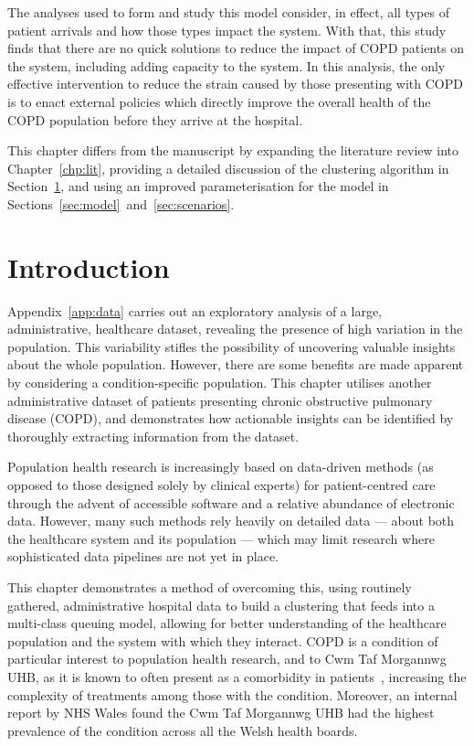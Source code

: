 The analyses used to form and study this model consider, in effect, all types of
patient arrivals and how those types impact the system. With that, this study
finds that there are no quick solutions to reduce the impact of COPD patients on
the system, including adding capacity to the system. In this analysis, the only
effective intervention to reduce the strain caused by those presenting with COPD
is to enact external policies which directly improve the overall health of the
COPD population before they arrive at the hospital.

\myrule%

This chapter differs from the manuscript by expanding the literature review into
Chapter~\ref{chp:lit}, providing a detailed discussion of the clustering
algorithm in Section~\ref{sec:intro}, and using an improved parameterisation for
the model in Sections~\ref{sec:model}~and~\ref{sec:scenarios}.

\section{Introduction}\label{sec:intro}

Appendix~\ref{app:data} carries out an exploratory analysis of a large,
administrative, healthcare dataset, revealing the presence of high variation in
the population. This variability stifles the possibility of uncovering valuable
insights about the whole population. However, there are some benefits are made
apparent by considering a condition-specific population. This chapter utilises
another administrative dataset of patients presenting chronic obstructive
pulmonary disease (COPD), and demonstrates how actionable insights can be
identified by thoroughly extracting information from the dataset.

Population health research is increasingly based on data-driven methods (as
opposed to those designed solely by clinical experts) for patient-centred care
through the advent of accessible software and a relative abundance of electronic
data. However, many such methods rely heavily on detailed data — about both the
healthcare system and its population — which may limit research where
sophisticated data pipelines are not yet in place.

This chapter demonstrates a method of overcoming this, using routinely gathered,
administrative hospital data to build a clustering that feeds into a multi-class
queuing model, allowing for better understanding of the healthcare population
and the system with which they interact. COPD is a condition of particular
interest to population health research, and to Cwm Taf Morgannwg UHB, as it is
known to often present as a comorbidity in patients~\cite{Houben2019},
increasing the complexity of treatments among those with the condition.
Moreover, an internal report by NHS Wales found the Cwm Taf Morgannwg UHB had
the highest prevalence of the condition across all the Welsh health boards.

